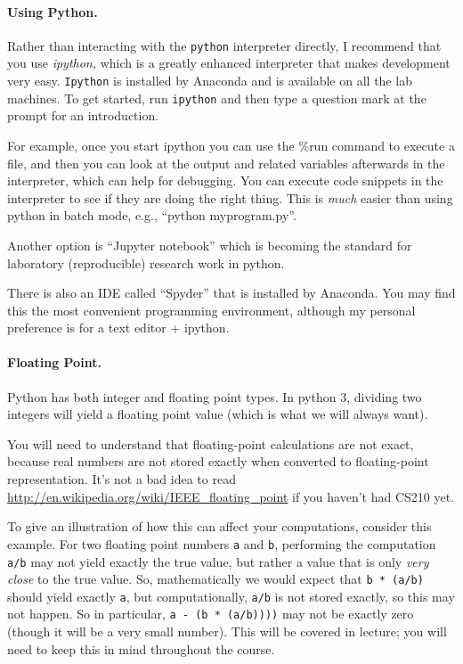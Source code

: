 \documentclass{article}
\begin{document}
\paragraph{Using Python.}  Rather than interacting with the
\texttt{python} interpreter directly, I recommend that you use
\emph{ipython,} which is a greatly enhanced interpreter that makes
development very easy.  \texttt{Ipython} is installed by Anaconda and is
available on all the lab machines.  To get started, run \texttt{ipython}
and then type a question mark at the prompt for an introduction.

For example, once you start ipython you can use the
\%run command to execute a file, and then you can look at the output and
related variables afterwards in the interpreter, which can help for
debugging.  You can execute code snippets in the interpreter to see if
they are doing the right thing.  This is \emph{much} easier than using
python in batch mode, e.g., ``python myprogram.py''.

Another option is ``Jupyter notebook'' which is becoming the standard
for laboratory (reproducible) research work in python.

There is also an IDE called ``Spyder''
that is installed by Anaconda.  You may find this the most convenient
programming environment, although my personal preference is for a text
editor + ipython.

\paragraph{Floating Point.}  Python has both integer and floating point types.  In python 3, dividing two integers will yield a floating point value (which is what we will always want).

You will need to understand that floating-point calculations are not exact, because real numbers are not stored exactly when converted to floating-point representation.   It's not a bad idea to read \url{http://en.wikipedia.org/wiki/IEEE_floating_point} if you haven't had CS210 yet.   

To give an illustration of how this can affect your computations, consider this example.   For two floating point numbers \texttt{a} and \texttt{b}, performing the computation \texttt{a/b} may not yield exactly the true value, but rather a value that is only \emph{very close} to the true value.    So, mathematically we would expect that \texttt{b * (a/b)} should yield exactly \texttt{a}, but computationally, \texttt{a/b} is not stored exactly, so this may not happen.   So in particular, \texttt{a - (b * (a/b))))} may not be exactly zero (though it will be a very small number).   This will be covered in lecture; you will need to keep this in mind throughout the course.
\end{document}
